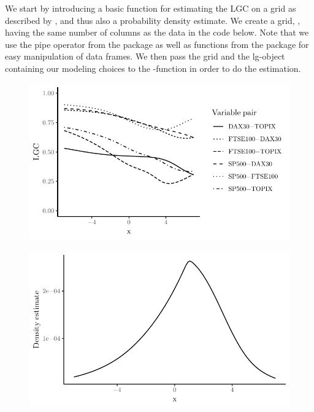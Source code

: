 We start by introducing a basic function for estimating the LGC on a grid as described by \citet{otne:tjos:2017}, and thus also a probability density estimate. We create a grid, , having the same number of columns as the data in the code below. Note that we use the pipe operator \code{\%\textgreater{}\%} from the  package \citep{bach:wick:2014} as well as functions from the  package \citep{wick:fran:mull:2018} for easy manipulation of data frames. We then pass the grid and the lg-object containing our modeling choices to the -function in order to do the estimation.

\begin{figure}[t]
    \centering
    \begin{minipage}[t]{0.48\textwidth}
      \includegraphics[width=\textwidth]{loccor-example}
      \label{fig:lgc-plot1}
    \end{minipage}
    \begin{minipage}[t]{0.48\textwidth}
      \includegraphics[width=\textwidth]{density-example}

\end{minipage}
\end{figure}
